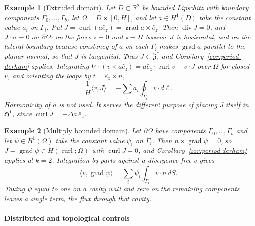 \documentclass{article}
\newtheorem{example}{Example}[section]
\DeclareMathOperator{\grad}{grad}
\DeclareMathOperator{\curl}{curl}
\DeclareMathOperator{\divergence}{div}
\newcommand{\f}[1]{\mathfrak{#1}}
\newcommand{\R} {\mathbb R}
\newcommand{\HH}{\mathfrak H}
\newcommand{\ip}[2]{\langle #1,#2\rangle}
\begin{document}
\begin{example}[Extruded domain]\label{ex:period-extruded}
Let $D\subset\R^{2}$ be bounded Lipschitz with boundary components
$\Gamma_0,\dots,\Gamma_b$, let $\Omega=D\times[0,H]$, and let $a\in H^{1}(D)$
take the constant value $a_i$ on $\Gamma_i$. Put $J=\curl(a\hat e_z)
=\grad a\times\hat e_z$. Then $\divergence J=0$, and $J\cdot n=0$ on
$\partial\Omega$: on the faces $z=0$ and $z=H$ because $J$ is horizontal, and
on the lateral boundary because constancy of $a$ on each $\Gamma_i$ makes
$\grad a$ parallel to the planar normal, so that $J$ is tangential. Thus
$J\in\f Z^{*}_{1}$ and Corollary~\ref{cor:period-derham} applies. Integrating
$\nabla\cdot(v\times a\hat e_z)=a\hat e_z\cdot\curl v-v\cdot J$ over $\Omega$
for closed $v$, and orienting the loops by $t=\hat e_z\times n$,
\begin{equation}
 \frac1H\ip{v}{J}=-\sum_i a_i\oint_{\Gamma_i}v\cdot d\ell .
\end{equation}
Harmonicity of $a$ is not used. It serves the different purpose of placing $J$
itself in $\HH^{1}$, since $\curl J=-\Delta a\,\hat e_z$.
\end{example}

\begin{example}[Multiply bounded domain]\label{ex:period-cavity}
Let $\partial\Omega$ have components $\Gamma_0,\dots,\Gamma_b$ and let
$\psi\in H^{1}(\Omega)$ take the constant value $\psi_i$ on $\Gamma_i$. Then
$n\times\grad\psi=0$, so $J=\grad\psi\in\mathring H(\curl;\Omega)$ with
$\curl J=0$, and Corollary~\ref{cor:period-derham} applies at $k=2$.
Integration by parts against a divergence-free $v$ gives
\begin{equation}
 \ip{v}{\grad\psi}=\sum_i\psi_i\int_{\Gamma_i}v\cdot n\,dS .
\end{equation}
Taking $\psi$ equal to one on a cavity wall and zero on the remaining
components leaves a single term, the flux through that cavity.
\end{example}




\paragraph{Distributed and topological controls}
\end{document}
